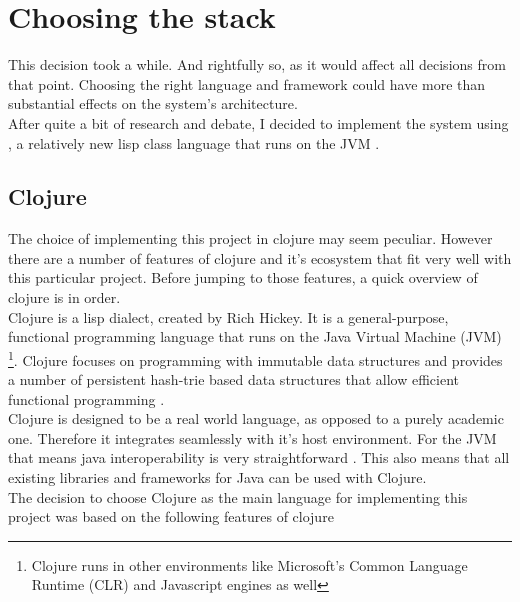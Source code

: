 
\chapter{Choosing the stack} %

\label{ch:stack} %

This decision took a while. And rightfully so, as it would affect all decisions from that point. Choosing the right language and framework could have more than substantial effects on the system's architecture.\\

After quite a bit of research and debate, I decided to implement the system using , a relatively new lisp class language that runs on the JVM \citep{clojure:features}.

\section{Clojure}

The choice of implementing this project in clojure may seem peculiar. However there are a number of features of clojure and it's ecosystem that fit very well with this particular project. Before jumping to those features, a quick overview of clojure is in order.\\

Clojure is a lisp dialect, created by Rich Hickey. It is a general-purpose, functional programming language that runs on the Java Virtual Machine (JVM) \footnote{Clojure runs in other environments like Microsoft's Common Language Runtime (CLR) and Javascript engines as well}. Clojure focuses on programming with immutable data structures and provides a number of persistent hash-trie based data structures that allow efficient functional programming \citep{clojure:ds}.\\

Clojure is designed to be a real world language, as opposed to a purely academic one. Therefore it integrates seamlessly with it's host environment. For the JVM that means java interoperability is very straightforward \citep{clojure:interop}. This also means that all existing libraries and frameworks for Java can be used with Clojure.\\

The decision to choose Clojure as the main language for implementing this project was based on the
following features of clojure

